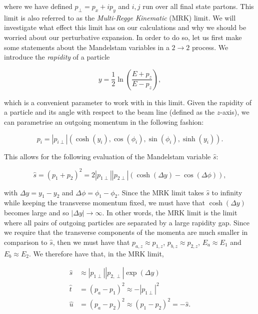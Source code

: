 where we have defined $p_{\perp} = p_x + i p_y$ and $i,j$ run over all final state partons. This limit is also referred to as the \emph{Multi-Regge Kinematic} (MRK) limit. We will investigate what effect this limit has on our calculations and why we should be worried about our perturbative expansion. In order to do so, let us first make some statements about the Mandelstam variables in a $2 \to 2$ process. We introduce the \emph{rapidity} of a particle

\begin{equation}
y = \frac{1}{2} \ln \left( \frac{E + p_z}{E - p_z} \right),
\end{equation}

which is a convenient parameter to work with in this limit. Given the rapidity of a particle and its angle with respect to the beam line (defined as the $z$-axis), we can parametrise an outgoing momentum in the following fashion:

\begin{equation}
p_i = |p_{i \perp}| (\cosh(y_i), \cos(\phi_i), \sin(\phi_i), \sinh(y_i)).
\end{equation}

This allows for the following evaluation of the Mandelstam variable $\hat{s}$:

\begin{equation}
\hat{s} = (p_1 + p_2)^2 = 2 |p_{1 \perp}| |p_{2 \perp}| \left(\cosh(\Delta y) - \cos(\Delta \phi)\right),
\end{equation}

with $\Delta y = y_1 - y_2$ and $\Delta \phi = \phi_1 - \phi_2$. Since the MRK limit takes $\hat{s}$ to infinity while keeping the transverse momentum fixed, we must have that $\cosh(\Delta y)$ becomes large and so $|\Delta y| \to \infty$. In other words, the MRK limit is the limit where all pairs of outgoing particles are separated by a large rapidity gap. Since we require that the transverse components of the momenta are much smaller in comparison to $\hat{s}$, then we must have that $p_{a,z} \approx p_{1,z}$, $p_{b,z} \approx p_{2,z}$, $E_a \approx E_1$ and $E_b \approx E_2$. We therefore have that, in the MRK limit,

\begin{subequations}
\begin{align}
\hat{s} &\approx |p_{1 \perp}| |p_{2, \perp}| \exp(\Delta y) \\
\hat{t}  &= (p_a - p_1)^2 \approx  -|p_{1 \perp}|^2 \\
\hat{u} &= (p_a - p_2)^2 \approx (p_1 - p_2)^2 = -\hat{s}.
\end{align}
\end{subequations}

